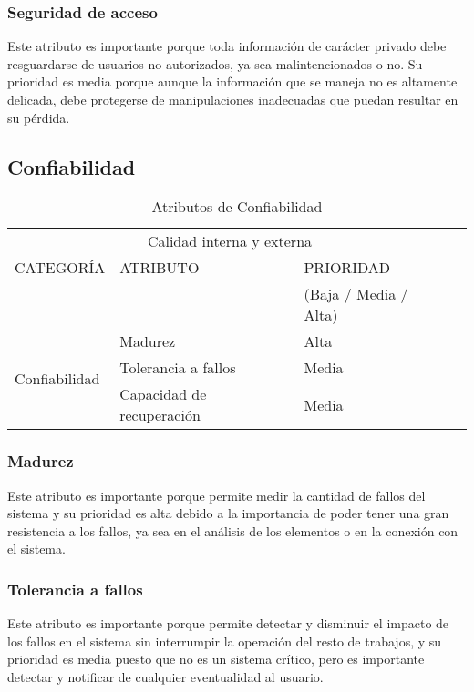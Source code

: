 \documentclass[12pt]{article}
\begin{document}
\subsubsection{Seguridad de acceso}

\vspace*{0.2in}
Este atributo es importante porque toda información de carácter privado debe resguardarse de usuarios no autorizados, ya sea malintencionados o no. Su prioridad es media porque aunque la información que se maneja no es altamente delicada, debe protegerse de manipulaciones inadecuadas que puedan resultar en su pérdida.
\vspace*{0.3in}
\\[1 cm]
\subsection{Confiabilidad}

\begin{table}[htb]%
\centering
\begin{tabular}{|l|l|l|l|}
\hline
\multicolumn{3}{|c|}{Calidad interna y externa   } \\
\cline{1-3}
CATEGORÍA & ATRIBUTO & PRIORIDAD\\ & & (Baja / Media / Alta)\\
\hline \hline
\multirow{3}{3cm}{Confiabilidad} & Madurez & Alta \\ \cline{2-3}
& Tolerancia a fallos &  Media\\ \cline{2-3}
& Capacidad de recuperación & Media\\ \cline{1-3}
\end{tabular}
\caption{Atributos de Confiabilidad}
\label{tabla:final}
\end{table}%
\vspace*{0.1in}
\subsubsection{Madurez}
\vspace*{0.2in}
Este atributo es importante porque permite medir la cantidad de fallos del sistema y su prioridad es alta debido a la importancia de poder tener una gran resistencia a los fallos, ya sea en el análisis de los elementos o en la conexión con el sistema.
\subsubsection{Tolerancia a fallos}
\vspace*{0.2in}
Este atributo es importante porque permite detectar y disminuir el impacto de los fallos en el sistema sin interrumpir la operación del resto de trabajos, y su prioridad es media puesto que no es un sistema crítico, pero es importante detectar y notificar de cualquier eventualidad al usuario. 
\end{document}

